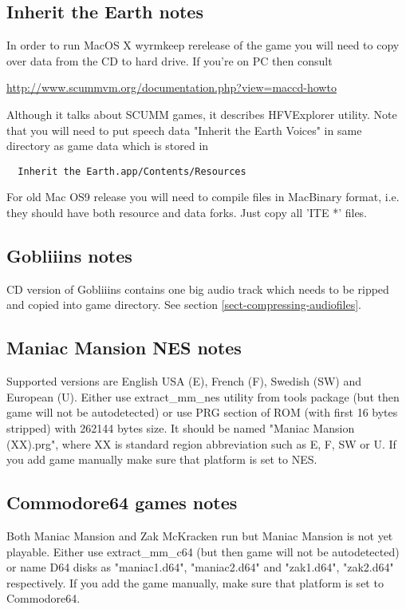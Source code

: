 \subsection{Inherit the Earth notes}
In order to run MacOS X wyrmkeep rerelease of the game you will need to copy
over data from the CD to hard drive. If you're on PC then consult

\url{http://www.scummvm.org/documentation.php?view=maccd-howto}

Although it talks about SCUMM games, it describes HFVExplorer utility. Note
that you will need to put speech data "Inherit the Earth Voices" in same
directory as game data which is stored in

\begin{verbatim}
  Inherit the Earth.app/Contents/Resources
\end{verbatim}

For old Mac OS9 release you will need to compile files in MacBinary format,
i.e. they should have both resource and data forks. Just copy all 'ITE *' files.


\subsection{Gobliiins notes}
CD version of Gobliiins contains one big audio track which needs to be ripped
and copied into game directory. See section \ref{sect-compressing-audiofiles}.

\subsection{Maniac Mansion NES notes}
Supported versions are English USA (E), French (F), Swedish (SW) and European
(U). Either use extract\_mm\_nes utility from tools package (but then game
will not be autodetected) or use PRG section of ROM (with first 16 bytes
stripped) with 262144 bytes size. It should be named "Maniac Mansion (XX).prg",
where XX is standard region abbreviation such as E, F, SW or U. If you add
game manually make sure that platform is set to NES.

\subsection{Commodore64 games notes}
Both Maniac Mansion and Zak McKracken run but Maniac Mansion is not yet
playable. Either use extract\_mm\_c64 (but then game will not be autodetected)
or name D64 disks as "maniac1.d64", "maniac2.d64" and "zak1.d64", "zak2.d64"
respectively. If you add the game manually, make sure that platform is set to
Commodore64.
